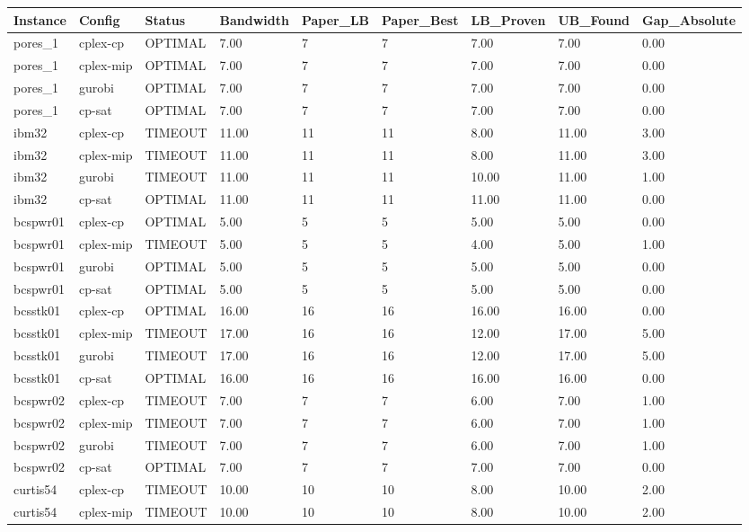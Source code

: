 \begin{tabular}{lllllllll}
\hline
Instance & Config & Status & Bandwidth & Paper\_LB & Paper\_Best & LB\_Proven & UB\_Found & Gap\_Absolute \\
\hline
pores\_1 & cplex-cp & OPTIMAL & 7.00 & 7 & 7 & 7.00 & 7.00 & 0.00 \\
pores\_1 & cplex-mip & OPTIMAL & 7.00 & 7 & 7 & 7.00 & 7.00 & 0.00 \\
pores\_1 & gurobi & OPTIMAL & 7.00 & 7 & 7 & 7.00 & 7.00 & 0.00 \\
pores\_1 & cp-sat & OPTIMAL & 7.00 & 7 & 7 & 7.00 & 7.00 & 0.00 \\
ibm32 & cplex-cp & TIMEOUT & 11.00 & 11 & 11 & 8.00 & 11.00 & 3.00 \\
ibm32 & cplex-mip & TIMEOUT & 11.00 & 11 & 11 & 8.00 & 11.00 & 3.00 \\
ibm32 & gurobi & TIMEOUT & 11.00 & 11 & 11 & 10.00 & 11.00 & 1.00 \\
ibm32 & cp-sat & OPTIMAL & 11.00 & 11 & 11 & 11.00 & 11.00 & 0.00 \\
bcspwr01 & cplex-cp & OPTIMAL & 5.00 & 5 & 5 & 5.00 & 5.00 & 0.00 \\
bcspwr01 & cplex-mip & TIMEOUT & 5.00 & 5 & 5 & 4.00 & 5.00 & 1.00 \\
bcspwr01 & gurobi & OPTIMAL & 5.00 & 5 & 5 & 5.00 & 5.00 & 0.00 \\
bcspwr01 & cp-sat & OPTIMAL & 5.00 & 5 & 5 & 5.00 & 5.00 & 0.00 \\
bcsstk01 & cplex-cp & OPTIMAL & 16.00 & 16 & 16 & 16.00 & 16.00 & 0.00 \\
bcsstk01 & cplex-mip & TIMEOUT & 17.00 & 16 & 16 & 12.00 & 17.00 & 5.00 \\
bcsstk01 & gurobi & TIMEOUT & 17.00 & 16 & 16 & 12.00 & 17.00 & 5.00 \\
bcsstk01 & cp-sat & OPTIMAL & 16.00 & 16 & 16 & 16.00 & 16.00 & 0.00 \\
bcspwr02 & cplex-cp & TIMEOUT & 7.00 & 7 & 7 & 6.00 & 7.00 & 1.00 \\
bcspwr02 & cplex-mip & TIMEOUT & 7.00 & 7 & 7 & 6.00 & 7.00 & 1.00 \\
bcspwr02 & gurobi & TIMEOUT & 7.00 & 7 & 7 & 6.00 & 7.00 & 1.00 \\
bcspwr02 & cp-sat & OPTIMAL & 7.00 & 7 & 7 & 7.00 & 7.00 & 0.00 \\
curtis54 & cplex-cp & TIMEOUT & 10.00 & 10 & 10 & 8.00 & 10.00 & 2.00 \\
curtis54 & cplex-mip & TIMEOUT & 10.00 & 10 & 10 & 8.00 & 10.00 & 2.00 \\

\end{tabular}
